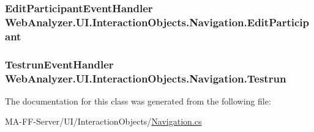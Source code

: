 \subsubsection[{Edit\+Participant}]{\setlength{\rightskip}{0pt plus 5cm}Edit\+Participant\+Event\+Handler Web\+Analyzer.\+U\+I.\+Interaction\+Objects.\+Navigation.\+Edit\+Participant}\label{class_web_analyzer_1_1_u_i_1_1_interaction_objects_1_1_navigation_adc0aa816457297571e9dd44ffe09a372}
\hypertarget{class_web_analyzer_1_1_u_i_1_1_interaction_objects_1_1_navigation_a34448e99688e6e15b470a981a86a4bba}{}
\subsubsection[{Testrun}]{\setlength{\rightskip}{0pt plus 5cm}Testrun\+Event\+Handler Web\+Analyzer.\+U\+I.\+Interaction\+Objects.\+Navigation.\+Testrun}\label{class_web_analyzer_1_1_u_i_1_1_interaction_objects_1_1_navigation_a34448e99688e6e15b470a981a86a4bba}


The documentation for this class was generated from the following file\+:\begin{DoxyCompactItemize}
\item 
M\+A-\/\+F\+F-\/\+Server/\+U\+I/\+Interaction\+Objects/\hyperlink{_navigation_8cs}{Navigation.\+cs}\end{DoxyCompactItemize}
